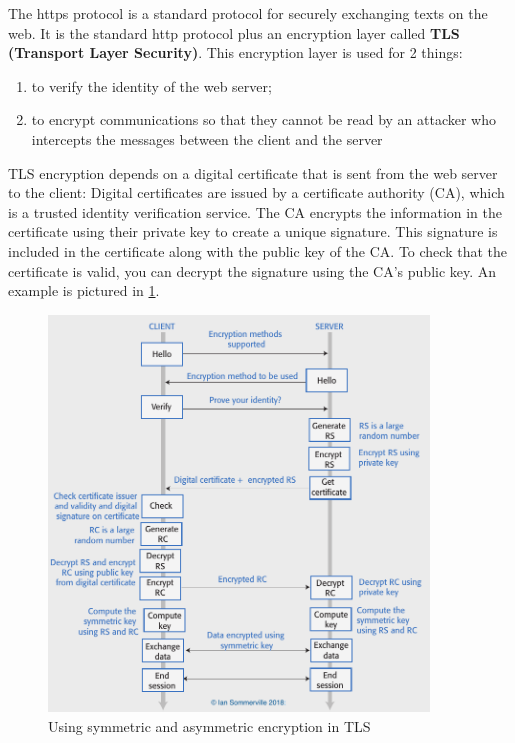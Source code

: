 \documentclass[10pt,a4paper]{report}
\begin{document}
The https protocol is a standard protocol for securely exchanging texts on the web. It is the standard http protocol plus an encryption layer called \textbf{TLS
(Transport Layer Security)}. This encryption layer is used for 2 things:
\begin{enumerate}
	\item to verify the identity of the web server;
	\item to encrypt communications so that they cannot be read by an attacker who
	intercepts the messages between the client and the server
	
\end{enumerate}
TLS encryption depends on a digital certificate that is sent from the web server to the client: Digital certificates are issued by a certificate authority (CA), which is a trusted identity verification service. The CA encrypts the information in the certificate using their private key to create a unique signature. This signature is included in the certificate along with the public key of the CA. To check that the certificate is valid, you can decrypt the signature using the CA’s public key. An example is pictured in \ref{image91}. 
\begin{figure}[h]
	\centering
	\includegraphics[width=0.9\textwidth]{image91}
	\caption{Using symmetric and asymmetric encryption in TLS}
	\label{image91}
\end{figure} 
\end{document}
